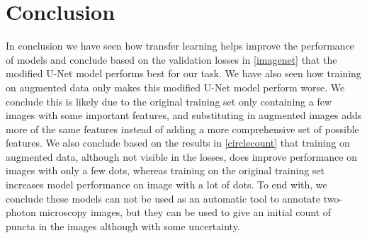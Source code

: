 \section{Conclusion}
In conclusion we have seen how transfer learning helps improve the performance of models and conclude based on the validation losses in \autoref{imagenet} that the modified U-Net model performs best for our task. We have also seen how training on augmented data only makes this modified U-Net model perform worse. We conclude this is likely due to the original training set only containing a few images with some important features, and substituting in augmented images adds more of the same features instead of adding a more comprehensive set of possible features. We also conclude based on the results in \autoref{circlecount} that training on augmented data, although not visible in the losses, does improve performance on images with only a few dots, whereas training on the original training set increases model performance on image with a lot of dots. To end with, we conclude these models can not be used as an automatic tool to annotate two-photon microscopy images, but they can be used to give an initial count of puncta in the images although with some uncertainty.
